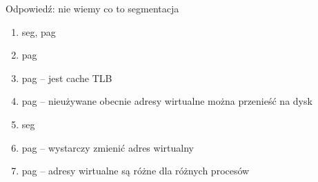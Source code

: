 Odpowiedź:
nie wiemy co to segmentacja
\begin{enumerate}
	\item seg, pag
	\item pag
	\item pag -- jest cache TLB
	\item pag -- nieużywane obecnie adresy wirtualne można przenieść na dysk
	\item seg
	\item pag -- wystarczy zmienić adres wirtualny
	\item pag -- adresy wirtualne są różne dla różnych procesów
\end{enumerate}
